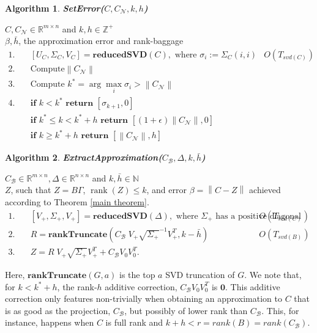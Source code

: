 \documentclass[11pt]{article}
\newcommand{\rank}{\operatorname{rank}}
\newtheorem{alg}{Algorithm}
\def\reals{\mathbb{R}}
\newcommand{\norm}[1]{\left\|#1\right\|}
\newcommand{\B}{\mathcal{B}}
\newcommand{\N}{\mathcal{N}}
\newcommand{\G}{\Gamma}
\newcommand{\0}{\ensuremath{\mathbf{0}}}
\renewcommand{\>}{\succ}
\newcommand{\<}{\prec}
\begin{document}
\begin{framed}
\begin{alg}\label{alg:seterr}
{\bf SetError($C, C_{\N}, k, h$) }
\end{alg}
 $C, C_{\N} \in \reals^{m \times n}$ and $k, h \in \mathbb{Z^+}$\\
 $\beta, \bar h$, the approximation error and rank-baggage
%
\begin{align*}
1. \quad& [U_C, \Sigma_C, V_C] = \textbf{reducedSVD}(C), \text{ where } \sigma_i := \Sigma_C (i, i)  & O\left( T_{svd(C)} \right) \\
2. \quad& \text{Compute} \norm{C_{\N}}\\
3. \quad& \text{Compute } k^* = \arg \max_i \sigma_i > \norm{C_{\N}} \\
4. \quad& \textbf{if } k < k^* \textbf{ return } [\sigma_{k+1}, 0] \\
 \quad& \textbf{if } k^* \leq k < k^* + h \textbf{ return } [(1 + \epsilon) \norm{C_{\N}}, 0] \\
\quad& \textbf{if } k \geq k^* + h \textbf{ return } [\norm{C_{\N}}, h] 
\end{align*}
%
\end{framed}


\begin{framed}
\begin{alg}\label{alg:extractApprox}
{\bf ExtractApproximation($C_{\B}, \Delta, k, \bar h$) }
\end{alg}
 $C_{\B} \in \reals^{m \times n}, \Delta \in \reals^{n \times n}$ and $k, \bar h \in \mathbb{N}$\\
 $Z$, such that $Z=B \G$, $\rank(Z) \leq k$, and error $\beta = \norm{C - Z}$ achieved according to Theorem \ref{main theorem}.
%
\begin{align*}
1. \quad& [V_+, \Sigma_+, V_+] = \textbf{reducedSVD} (\Delta),\text{ where } \Sigma_+ \text{ has a positive diagonal } & O\left(T_{svd(C)} \right)\\
2. \quad& R = \textbf{rankTruncate}\left( C_{\B} \; V_+ \sqrt{\Sigma_+}^{-1} V_+ ^T, k - \bar h \right)  & O\left( T_{svd(B)} \right)\\
3. \quad& Z = R \; V_+ \sqrt{\Sigma_+} V_+ ^T  + C_{\B} V_0 V_0 ^T.
\end{align*}
%
\end{framed}
\noindent Here, $\textbf{rankTruncate}(G, a)$ is the top $a$ SVD truncation of $G$. We note that, for $k < k^* + h$, the rank-$h$ additive correction, $C_{\B} V_0 V_0 ^T$ is $\mathbf{0}$. This additive correction only features non-trivially when obtaining an approximation to $C$ that is as good as the projection, $C_{\B}$, but possibly of lower rank than $C_{\B}$. This, for instance, happens when $C$ is full rank and $k + h < r = rank(B) = rank(C_{\B})$. 
\end{document}
